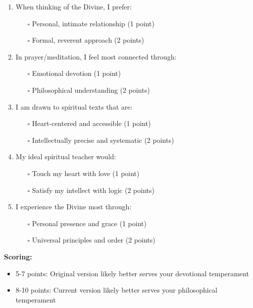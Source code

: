 \documentclass[11pt,twoside]{book}
\begin{document}
\begin{enumerate}
\item When thinking of the Divine, I prefer:
\begin{itemize}
\item[{$\square$}] Personal, intimate relationship (1 point)
\item[{$\square$}] Formal, reverent approach (2 points)
\end{itemize}

\item In prayer/meditation, I feel most connected through:
\begin{itemize}
\item[{$\square$}] Emotional devotion (1 point)
\item[{$\square$}] Philosophical understanding (2 points)
\end{itemize}

\item I am drawn to spiritual texts that are:
\begin{itemize}
\item[{$\square$}] Heart-centered and accessible (1 point)
\item[{$\square$}] Intellectually precise and systematic (2 points)
\end{itemize}

\item My ideal spiritual teacher would:
\begin{itemize}
\item[{$\square$}] Touch my heart with love (1 point)
\item[{$\square$}] Satisfy my intellect with logic (2 points)
\end{itemize}

\item I experience the Divine most through:
\begin{itemize}
\item[{$\square$}] Personal presence and grace (1 point)
\item[{$\square$}] Universal principles and order (2 points)
\end{itemize}
\end{enumerate}

\textbf{\textbf{Scoring:}}
\begin{itemize}
\item 5-7 points: Original version likely better serves your devotional temperament
\item 8-10 points: Current version likely better serves your philosophical temperament
\end{itemize}
\end{document}
